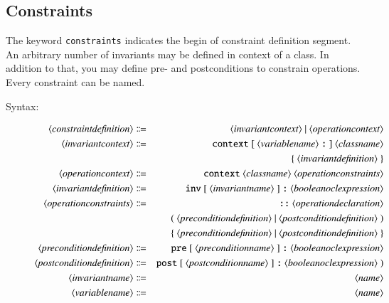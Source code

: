 \documentclass[a4paper,titlepage,oneside,final]{scrreprt} %
\begin{document}
\subsection{Constraints}
The keyword \verb+constraints+  indicates the begin of constraint definition segment.
An arbitrary number of invariants may be defined in context of a class.
In addition to that, you may define pre- and postconditions
to constrain operations. Every constraint can be named.
\begin{description}
\item[Syntax:]
\begin{eqnarray*}
\langle\mathit{constraintdefinition}\rangle &\Coloneqq&
\langle\mathit{invariantcontext}\rangle~|~\langle\mathit{operationcontext}\rangle\\
\langle\mathit{invariantcontext}\rangle &\Coloneqq&
\verb+context+~[~\langle\mathit{variablename}\rangle~\verb+:+~]~\langle\mathit{classname}\rangle\\
&&\{~\langle\mathit{invariantdefinition}\rangle~\}\\
\langle\mathit{operationcontext}\rangle &\Coloneqq&
\verb+context+~\langle\mathit{classname}\rangle~\langle\mathit{operationconstraints}\rangle\\
\langle\mathit{invariantdefinition}\rangle &\Coloneqq&
\verb+inv+~[~\langle\mathit{invariantname}\rangle~]~\verb+:+~\langle\mathit{booleanoclexpression}\rangle\\
\langle\mathit{operationconstraints}\rangle &\Coloneqq&
\verb+::+~\langle\mathit{operationdeclaration}\rangle\\
&&(~\langle\mathit{preconditiondefinition}\rangle~|~\langle\mathit{postconditiondefinition}\rangle~)\\
&&\{~\langle\mathit{preconditiondefinition}\rangle~|~
\langle\mathit{postconditiondefinition}\rangle~\}\\
\langle\mathit{preconditiondefinition}\rangle &\Coloneqq&
\verb+pre+~[~\langle\mathit{preconditionname}\rangle~]~
\verb+:+~\langle\mathit{booleanoclexpression}\rangle\\
\langle\mathit{postconditiondefinition}\rangle &\Coloneqq&
\verb+post+~[~\langle\mathit{postconditionname}\rangle~]~
\verb+:+~\langle\mathit{booleanoclexpression}\rangle~)\\
\langle\mathit{invariantname}\rangle &\Coloneqq& \langle\mathit{name}\rangle\\
\langle\mathit{variablename}\rangle &\Coloneqq& \langle\mathit{name}\rangle\\

\end{eqnarray*}
\end{description}
\end{document}

